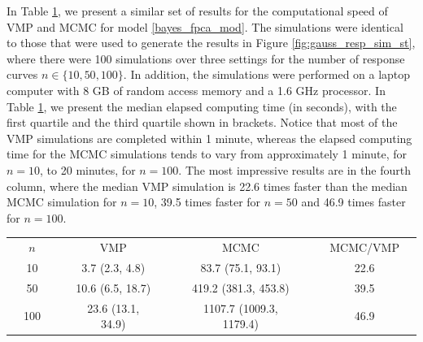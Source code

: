 \documentclass[12pt]{article}
\theoremstyle{plain}
\theoremstyle{definition}
\theoremstyle{remark}
\begin{document}
In Table \ref{tab:speed_comp}, we present a similar set of results for the computational speed of VMP and MCMC
for model \eqref{bayes_fpca_mod}. The simulations were identical to those that were used to generate the
results in Figure \ref{fig:gauss_resp_sim_st}, where there were 100 simulations over three settings for the number
of response curves $n \in \{10, 50, 100\}$. In addition, the simulations were performed on a laptop computer
with 8 GB of random access memory and a 1.6 GHz processor. In Table \ref{tab:speed_comp},
we present the median elapsed computing time (in seconds),
with the first quartile and the third quartile shown in brackets.
Notice that most of the VMP simulations are completed within 1 minute, whereas the elapsed computing time
for the MCMC simulations tends to vary from approximately 1 minute, for $n = 10$, to 20 minutes, for $n = 100$.
The most impressive results are in the fourth column, where the median VMP simulation is 22.6 times faster
than the median MCMC simulation for $n = 10$, 39.5 times faster for $n = 50$ and 46.9 times faster for $n = 100$.

\begin{table}
\begin{center}
\begin{tcolorbox}[size=tight,on line,left=0mm,right=0mm,width=0.9\textwidth,bottom=0mm,top=1mm,arc=0mm,outer arc=0pt, box align=center,boxrule=1.5pt]
\captionsetup{width=0.9\textwidth}
\begin{tabularx}{\textwidth}{X c X | X c X | X c X | X c X}
  \rowcolor[gray]{.8}
  & $n$ & & & VMP & & & MCMC & & & MCMC/VMP & \\
  \rowcolor{white!50}
  & 10 & & & 3.7 (2.3, 4.8) & & & 83.7 (75.1, 93.1) & & & 22.6 & \\
  \rowcolor{white!50}
  & 50 & & & 10.6 (6.5, 18.7) & & & 419.2 (381.3, 453.8) & & & 39.5 & \\
  \rowcolor{white!50}
  & 100 & & & 23.6 (13.1, 34.9) & & & 1107.7 (1009.3, 1179.4) & & & 46.9 & \\
\end{tabularx}
\label{tab:speed_comp}
\end{tcolorbox}
\end{center}
\end{table}
\end{document}

